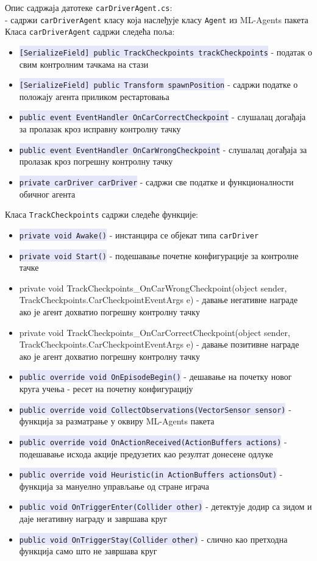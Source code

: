 \documentclass[12pt]{article}
\newcommand{\mycode}[1]{\texttt{\colorbox{Lavender}{#1}}}
\begin{document}
Опис садржаја датотеке \texttt{carDriverAgent.cs}:\\
- садржи \texttt{carDriverAgent} класу која наслеђује класу \texttt{Agent} из ML-Agents пакета
Класа \texttt{carDriverAgent} садржи следећа поља: 
\begin{itemize}
  \item \mycode{[SerializeField] public TrackCheckpoints trackCheckpoints} - податак о свим контролним тачкама на стази
  \item \mycode{[SerializeField] public Transform spawnPosition} - садржи податке о положају агента приликом рестартовања
  \item \mycode{public event EventHandler OnCarCorrectCheckpoint} - слушалац догађаја за пролазак кроз исправну контролну тачку
  \item \mycode{public event EventHandler OnCarWrongCheckpoint} - слушалац догађаја за пролазак кроз погрешну контролну тачку 
  \item \mycode{private carDriver carDriver} - садржи све податке и функционалности обичног агента 
\end{itemize}
\vspace{0.5cm}
Класа \texttt{TrackCheckpoints} садржи следеће функције: 
\begin{itemize}
  \item \mycode{private void Awake()} - инстанцира се објекат типа \texttt{carDriver}
  \item \mycode{private void Start()} - подешавање почетне конфигурације за контролне тачке
  \item private void TrackCheckpoints\_OnCarWrongCheckpoint(object sender, TrackCheckpoints.CarCheckpointEventArgs e) - давање негативне награде ако је агент дохватио погрешну контролну тачку
  \item private void TrackCheckpoints\_OnCarCorrectCheckpoint(object sender, TrackCheckpoints.CarCheckpointEventArgs e) - давање позитивне награде ако је агент дохватио погрешну контролну тачку
  \item \mycode{public override void OnEpisodeBegin()} - дешавање на почетку новог круга учења - ресет на почетну конфигурацију
  \item \mycode{public override void CollectObservations(VectorSensor sensor)} - функција за разматрање у оквиру ML-Agents пакета 
  \item \mycode{public override void OnActionReceived(ActionBuffers actions)} - подешавање исхода акције предузетих као резултат донесене одлуке
  \item \mycode{public override void Heuristic(in ActionBuffers actionsOut)} - функција за мануелно управљање од стране играча
  \item \mycode{public void OnTriggerEnter(Collider other)} - детектује додир са зидом и даје негативну награду и завршава круг
  \item \mycode{public void OnTriggerStay(Collider other)} - слично као претходна функција само што не завршава круг
\end{itemize}
\end{document}
